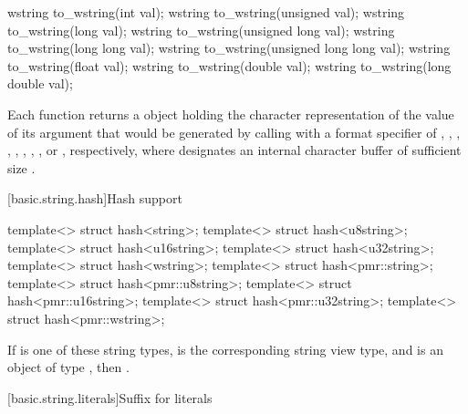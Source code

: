 %
\begin{itemdecl}
wstring to_wstring(int val);
wstring to_wstring(unsigned val);
wstring to_wstring(long val);
wstring to_wstring(unsigned long val);
wstring to_wstring(long long val);
wstring to_wstring(unsigned long long val);
wstring to_wstring(float val);
wstring to_wstring(double val);
wstring to_wstring(long double val);
\end{itemdecl}

\begin{itemdescr}
\pnum
\returns Each function returns a  object holding the character
representation of the value of its argument that would be generated by calling
 with a format specifier of
,
,
,
,
,
,
,
,
or , respectively, where  designates an
internal character buffer of sufficient size .
\end{itemdescr}

[basic.string.hash]{Hash support}

%
%
%
%
%
%
%
%
\begin{itemdecl}
template<> struct hash<string>;
template<> struct hash<u8string>;
template<> struct hash<u16string>;
template<> struct hash<u32string>;
template<> struct hash<wstring>;
template<> struct hash<pmr::string>;
template<> struct hash<pmr::u8string>;
template<> struct hash<pmr::u16string>;
template<> struct hash<pmr::u32string>;
template<> struct hash<pmr::wstring>;
\end{itemdecl}

\begin{itemdescr}
\pnum
If  is one of these string types,
 is the corresponding string view type, and
 is an object of type ,
then .
\end{itemdescr}

[basic.string.literals]{Suffix for  literals}

